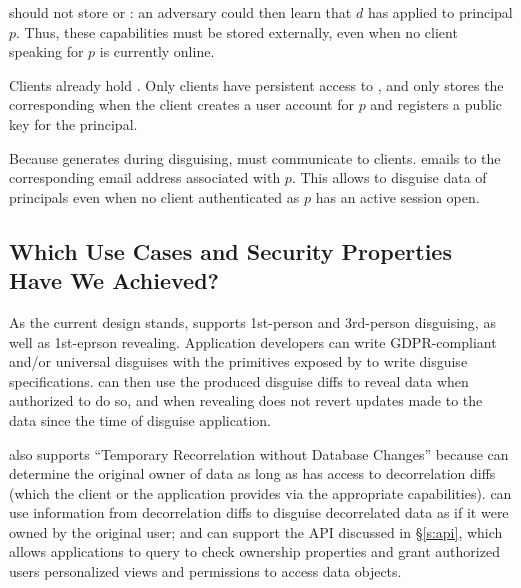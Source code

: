 \sys should not store  or : an adversary could then learn that $d$ has applied to
principal $p$. Thus, these capabilities must be stored externally, even when no client speaking for
$p$ is currently online.
%
%

Clients already hold . Only clients have persistent access to , and \sys only
stores the corresponding  when the client creates a user account for $p$ and registers a
public key  for the principal.

Because \sys generates  during disguising, \sys must communicate  to clients.
\sys emails  to the corresponding email address associated with $p$.  This allows \sys to
disguise data of principals even when no client authenticated as $p$ has an active session open.

\subsection{Which Use Cases and Security Properties Have We Achieved?}
As the current design stands, \sys supports 1st-person and 3rd-person disguising, as well as
1st-eprson revealing.
%
Application developers can write GDPR-compliant and/or universal disguises with the primitives
exposed by \sys to write disguise specifications.
%
\sys can then use the produced disguise diffs to reveal data when authorized to do so, and when
revealing does not revert updates made to the data since the time of disguise application.

%
\sys also supports ``Temporary Recorrelation without Database Changes'' because \sys can determine
the original owner of data as long as \sys has access to decorrelation diffs (which the client or
the application provides via the appropriate capabilities).
%
\sys can use information from decorrelation diffs to disguise decorrelated data as if it were owned
by the original user; and 
%
\sys can support the API discussed in \S\ref{s:api}, which allows applications to query \sys to
check ownership properties and grant authorized users personalized views and permissions to access
data objects.

